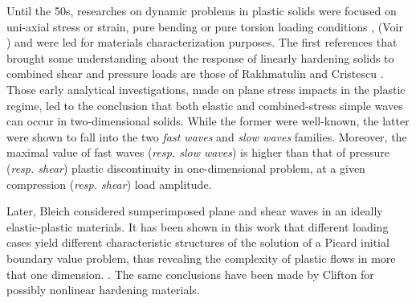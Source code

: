 



Until the 50s, researches on dynamic problems in plastic solids were focused on uni-axial stress or strain, pure bending or pure torsion loading conditions \cite{Taylor,vonKarman}, (Voir \cite{Clifton_thesis}) and were led for materials characterization purposes.
The first references that brought some understanding about the response of linearly hardening solids to combined shear and pressure loads are those of Rakhmatulin \cite{Rakhmatulin} and Cristescu \cite{CRISTESCU19591605}.
Those early analytical investigations, made on plane stress impacts in the plastic regime, led to the conclusion that both elastic and combined-stress simple waves can occur in two-dimensional solids. 
While the former were well-known, the latter were shown to fall into the two \textit{fast waves} and \textit{slow waves} families.
Moreover, the maximal value of fast waves (\textit{resp. slow waves}) is higher than that of pressure (\textit{resp. shear}) plastic discontinuity in one-dimensional problem, at a given compression (\textit{resp. shear}) load amplitude.

Later, Bleich \cite{Bleich} considered sumperimposed plane and shear waves in an ideally elastic-plastic materials.
It has been shown in this work that different loading cases yield different characteristic structures of the solution of a Picard initial boundary value problem, thus revealing the complexity of plastic flows in more that one dimension. 
. 
The same conclusions have been made by Clifton \cite{Clifton} for possibly nonlinear hardening materials.

